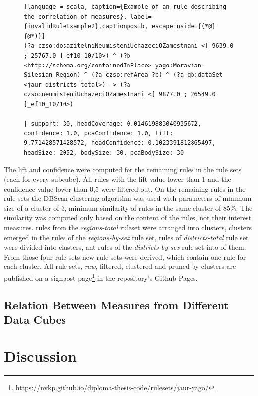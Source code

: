 \begin{figure}[h]
\begin{lstlisting}[language = scala, caption={Example of an rule describing the correlation of measures}, label={invalidRuleExample2},captionpos=b, escapeinside={(*@}{@*)}]
(?a czso:dosazitelniNeumisteniUchazeciOZamestnani <[ 9639.0 ; 25767.0 ]_ef10_10/10>) ^ (?b <http://schema.org/containedInPlace> yago:Moravian-Silesian_Region) ^ (?a czso:refArea ?b) ^ (?a qb:dataSet <jaur-districts-total>) -> (?a czso:neumisteniUchazeciOZamestnani <[ 9877.0 ; 26549.0 ]_ef10_10/10>) 

| support: 30, headCoverage: 0.014619883040935672, confidence: 1.0, pcaConfidence: 1.0, lift: 9.771428571428572, headConfidence: 0.1023391812865497, headSize: 2052, bodySize: 30, pcaBodySize: 30
\end{lstlisting}
\end{figure}

The lift and confidence were computed for the remaining rules in the rule sets (each for every subcube). All rules with the lift value lower than 1 and the confidence value lower than 0,5 were filtered out. On the remaining rules in the rule sets the DBScan clustering algorithm was used with parameters of minimum size of a cluster of 3, minimum similarity of rules in the same cluster of 85\%. The similarity was computed only based on the content of the rules, not their interest measures.  rules from the \textit{regions-total} ruleset were arranged into  clusters,  clusters emerged in the  rules of the \textit{regions-by-sex} rule set,  rules of \textit{districts-total} rule set were divided into  clusters, ant  rules of the \textit{districts-by-sex} rule set into  of them. From those four rule sets new rule sets were derived, which contain one rule for each cluster. All rule sets, \textit{raw}, filtered, clustered and pruned by clusters are published on a signpost page\footnote{\href{https://nvkp.github.io/diploma-thesis-code/rulesets/jaur-yago/}{https://nvkp.github.io/diploma-thesis-code/rulesets/jaur-yago/}} in the repository's Github Pages.

\subsection{Relation Between Measures from Different Data Cubes}



\section{Discussion}